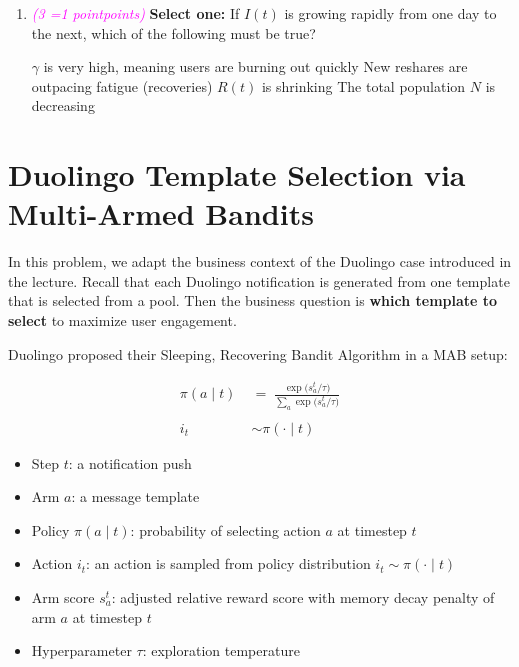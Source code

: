 \documentclass[11pt, letter, answers]{exam}
\newcommand{\grade}[1]{
    \small\textcolor{magenta}{\emph{(#1 \ifnum#1=1 point\else points\fi)}}%
    \normalsize
}
\newcommand{\sOne}{\textbf{Select one: }}
\begin{document}
\begin{enumerate}[label=(\alph*)]
\item \grade{3} \sOne If $I(t)$ is growing rapidly from one day to the next, which of the following must be true?
\begin{checkboxes}
    \choice $\gamma$ is very high, meaning users are burning out quickly
    \choice New reshares are outpacing fatigue (recoveries)
    \choice $R(t)$ is shrinking
    \choice The total population $N$ is decreasing
\end{checkboxes}

\end{enumerate}


\newpage
\section{Duolingo Template Selection via Multi-Armed Bandits}
\label{sec:a1_mab}
In this problem, we adapt the business context of the Duolingo case introduced in the lecture. Recall that each Duolingo notification is generated from one template that is selected from a pool. Then the business question is \textbf{which template to select} to maximize user engagement. 

Duolingo proposed their Sleeping, Recovering Bandit Algorithm in a MAB setup:

{
\Large
\begin{align}
    \pi(a\mid t) \;&=\; \frac{\exp\big(s_a^t/\tau\big)}{\sum_{a}\exp\big(s_{a}^t/\tau\big)}
    \label{eq:duolingo} 
    \\ 
    \nonumber \\
    i_t &\sim \pi(\cdot \mid t)
\end{align}
}

\begin{itemize}
    \item Step \(t\): a notification push
    \item Arm \(a\): a message template
    \item Policy \(\pi(a\mid t)\): probability of selecting action $a$ at timestep $t$
    \item Action $i_t$: an action is sampled from policy distribution $i_t \sim \pi(\cdot \mid t)$
    \item Arm score \(s_a^t\): adjusted relative reward score with memory decay penalty of arm \(a\) at timestep \(t\)
    \item Hyperparameter \(\tau\): exploration temperature
\end{itemize}
\end{document}
